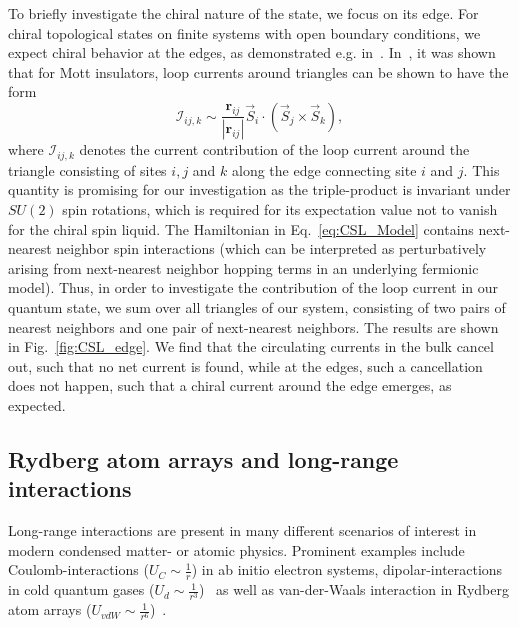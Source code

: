 \documentclass[aps,notitlepage,twocolumn,nofootinbib,superscriptaddress,pra,10pt]{revtex4-2}
\begin{document}
To briefly investigate the chiral nature of the state, we focus on its edge. For chiral topological states on finite systems with open boundary conditions, we expect chiral behavior at the edges, as demonstrated e.g. in~\cite{Rizzi17_FQH_trees, banerjee2023electromagnetic}. 
In~\cite{Khomskii08_edgecurrent}, it was shown that for Mott insulators, loop currents around triangles can be shown to have the form
\begin{equation}
    \mathcal{I}_{ij,k} \sim \frac{\textbf{r}_{ij}}{|\textbf{r}_{ij}|}\vec{S}_i \cdot ( \vec{S}_j \times \vec{S}_k),
\end{equation}
where $\mathcal{I}_{ij,k}$ denotes the current contribution of the loop current around the triangle consisting of sites $i,j$ and $k$ along the edge connecting site $i$ and $j$.
This quantity is promising for our investigation as the triple-product is invariant under $SU(2)$ spin rotations, which is required for its expectation value not to vanish for the chiral spin liquid. 
The Hamiltonian in Eq.~\eqref{eq:CSL_Model} contains next-nearest neighbor spin interactions (which can be interpreted as perturbatively arising from next-nearest neighbor hopping terms in an underlying fermionic model). 
Thus, in order to investigate the contribution of the loop current in our quantum state, we sum over all triangles of our system, consisting of two pairs of nearest neighbors and one pair of next-nearest neighbors. 
The results are shown in Fig.~\ref{fig:CSL_edge}.
We find that the circulating currents in the bulk cancel out, such that no net current is found, while at the edges, such a cancellation does not happen, such that a chiral current around the edge emerges, as expected.  

\subsection{Rydberg atom arrays and long-range interactions}

Long-range interactions are present in many different scenarios of interest in modern condensed matter- or atomic physics. Prominent examples include Coulomb-interactions ($U_C \sim \frac{1}{r}$) in ab initio electron systems, dipolar-interactions in cold quantum gases ($U_d \sim \frac{1}{r^3}$)~\cite{Lahaye_2009_dipolar_gases} as well as van-der-Waals interaction in Rydberg atom arrays ($U_{vdW} \sim \frac{1}{r^6}$)~\cite{labuhn2016_2dRysbergIsing, ebadi2021_rydbergExperiment}.
\end{document}
